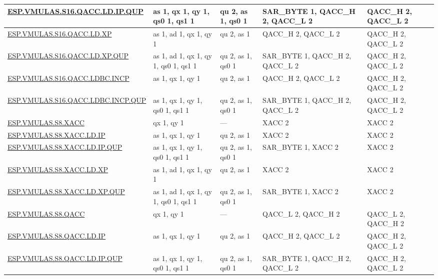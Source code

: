 \begin{longtable}[c]{|l|m{2.5cm}|m{2.5cm}|m{2.5cm}|m{2.5cm}|}
    \hyperref[instruction:ESPVMULASS16QACCLDIPQUP]{ESP.VMULAS.S16.QACC.LD.IP.QUP} & as 1, qx 1, qy 1, qs0 1, qs1 1 & qu 2, as 1, qs0 1 & SAR\_BYTE 1, QACC\_H 2, QACC\_L 2 & QACC\_H 2, QACC\_L 2\\\hline
    \hyperref[instruction:ESPVMULASS16QACCLDXP]{ESP.VMULAS.S16.QACC.LD.XP} & as 1, ad 1, qx 1, qy 1 & qu 2, as 1 & QACC\_H 2, QACC\_L 2 & QACC\_H 2, QACC\_L 2\\\hline
    \hyperref[instruction:ESPVMULASS16QACCLDXPQUP]{ESP.VMULAS.S16.QACC.LD.XP.QUP} & as 1, ad 1, qx 1, qy 1, qs0 1, qs1 1 & qu 2, as 1, qs0 1 & SAR\_BYTE 1, QACC\_H 2, QACC\_L 2 & QACC\_H 2, QACC\_L 2\\\hline
    \hyperref[instruction:ESPVMULASS16QACCLDBCINCP]{ESP.VMULAS.S16.QACC.LDBC.INCP} & as 1, qx 1, qy 1 & qu 2, as 1 & QACC\_H 2, QACC\_L 2 & QACC\_H 2, QACC\_L 2\\\hline
    \hyperref[instruction:ESPVMULASS16QACCLDBCINCPQUP]{ESP.VMULAS.S16.QACC.LDBC.INCP.QUP} & as 1, qx 1, qy 1, qs0 1, qs1 1 & qu 2, as 1, qs0 1 & SAR\_BYTE 1, QACC\_H 2, QACC\_L 2 & QACC\_H 2, QACC\_L 2\\\hline
    \hyperref[instruction:ESPVMULASS8XACC]{ESP.VMULAS.S8.XACC} & qx 1, qy 1 & — & XACC 2 & XACC 2\\\hline
    \hyperref[instruction:ESPVMULASS8XACCLDIP]{ESP.VMULAS.S8.XACC.LD.IP} & as 1, qx 1, qy 1 & qu 2, as 1 & XACC 2 & XACC 2\\\hline
    \hyperref[instruction:ESPVMULASS8XACCLDIPQUP]{ESP.VMULAS.S8.XACC.LD.IP.QUP} & as 1, qx 1, qy 1, qs0 1, qs1 1 & qu 2, as 1, qs0 1 & SAR\_BYTE 1, XACC 2 & XACC 2\\\hline
    \hyperref[instruction:ESPVMULASS8XACCLDXP]{ESP.VMULAS.S8.XACC.LD.XP} & as 1, ad 1, qx 1, qy 1 & qu 2, as 1 & XACC 2 & XACC 2\\\hline
    \hyperref[instruction:ESPVMULASS8XACCLDXPQUP]{ESP.VMULAS.S8.XACC.LD.XP.QUP} & as 1, ad 1, qx 1, qy 1, qs0 1, qs1 1 & qu 2, as 1, qs0 1 & SAR\_BYTE 1, XACC 2 & XACC 2\\\hline
    \hyperref[instruction:ESPVMULASS8QACC]{ESP.VMULAS.S8.QACC} & qx 1, qy 1 & — & QACC\_L 2, QACC\_H 2 & QACC\_L 2, QACC\_H 2\\\hline
    \hyperref[instruction:ESPVMULASS8QACCLDIP]{ESP.VMULAS.S8.QACC.LD.IP} & as 1, qx 1, qy 1 & qu 2, as 1 & QACC\_H 2, QACC\_L 2 & QACC\_H 2, QACC\_L 2\\\hline
    \hyperref[instruction:ESPVMULASS8QACCLDIPQUP]{ESP.VMULAS.S8.QACC.LD.IP.QUP} & as 1, qx 1, qy 1, qs0 1, qs1 1 & qu 2, as 1, qs0 1 & SAR\_BYTE 1, QACC\_H 2, QACC\_L 2 & QACC\_H 2, QACC\_L 2\\\hline

\end{longtable}
